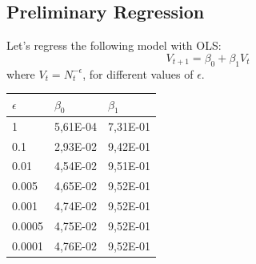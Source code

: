     \subsection{Preliminary Regression}
    Let's regress the following model with OLS:
    \begin{equation}
        V_{t+1} = \beta_0 + \beta_1 V_t
    \end{equation}
    where $V_t=N_t^{-\epsilon}$, for different values of $\epsilon$.
    \begin{table}[h!]
        \centering
        \begin{tabular}{lll}
            $\epsilon$ & $\beta_0$ & $\beta_1$ \\ \hline
            1      & 5,61E-04 & 7,31E-01 \\
            0.1    & 2,93E-02 & 9,42E-01 \\
            0.01   & 4,54E-02 & 9,51E-01 \\
            0.005  & 4,65E-02 & 9,52E-01 \\
            0.001  & 4,74E-02 & 9,52E-01 \\
            0.0005 & 4,75E-02 & 9,52E-01 \\
            0.0001 & 4,76E-02 & 9,52E-01
        \end{tabular}
    \end{table}
